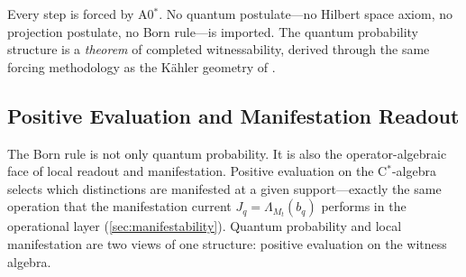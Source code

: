 Every step is forced by A0$^*$.  No quantum postulate---no Hilbert space
axiom, no projection postulate, no Born rule---is imported.  The
quantum probability structure is a \emph{theorem} of completed
witnessability, derived through the same forcing methodology as the
K\"{a}hler geometry of .

\subsection{Positive Evaluation and Manifestation Readout}
\label{sec:context-born:manifestation}

The Born rule is not only quantum probability.  It is also the
operator-algebraic face of local readout and manifestation.  Positive
evaluation on the C$^*$-algebra selects which distinctions are manifested
at a given support---exactly the same operation that the manifestation
current $J_q = \Lambda_{M_t}(b_q)$ performs in the operational layer
(\cref{sec:manifestability}).  Quantum probability and local manifestation
are two views of one structure: positive evaluation on the witness algebra.
